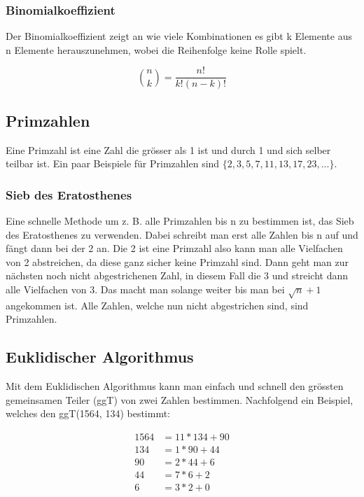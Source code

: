 \documentclass[12pt, a4paper, oneside]{article}
\begin{document}
\subsubsection{Binomialkoeffizient}
Der Binomialkoeffizient zeigt an wie viele Kombinationen es gibt k Elemente aus n Elemente herauszunehmen, wobei die Reihenfolge keine Rolle spielt.

\begin{equation*}
  \binom{n}{k} = \frac{n!}{k!(n-k)!}
\end{equation*}

\subsection{Primzahlen}
Eine Primzahl ist eine Zahl die grösser als 1 ist und durch 1 und sich selber teilbar ist. Ein paar Beispiele für Primzahlen sind $\{2, 3, 5, 7, 11, 13, 17, 23, ...\}$.

\subsubsection{Sieb des Eratosthenes}
Eine schnelle Methode um z. B. alle Primzahlen bis n zu bestimmen ist, das Sieb des Eratosthenes zu verwenden. Dabei schreibt man erst alle Zahlen bis n auf und fängt dann bei der 2 an. Die 2 ist eine Primzahl also kann man alle Vielfachen von 2 abstreichen, da diese ganz sicher keine Primzahl sind. Dann geht man zur nächsten noch nicht abgestrichenen Zahl, in diesem Fall die 3 und streicht dann alle Vielfachen von 3. Das macht man solange weiter bis man bei $\sqrt{n} + 1$ angekommen ist. Alle Zahlen, welche nun nicht abgestrichen sind, sind Primzahlen.

\subsection{Euklidischer Algorithmus}
Mit dem Euklidischen Algorithmus kann man einfach und schnell den grössten gemeinsamen Teiler (ggT) von zwei Zahlen bestimmen. Nachfolgend ein Beispiel, welches den ggT(1564, 134) bestimmt:

\begin{equation*} \label{eq2}
  \begin{split}
    1564 & = 11 * 134 + 90 \\
    134 & = 1 * 90 + 44 \\ 
    90 & = 2 * 44 + 6 \\
    44 & = 7 * 6 + 2 \\
    6 & = 3 * 2 + 0
  \end{split}  
\end{equation*}
\end{document}
